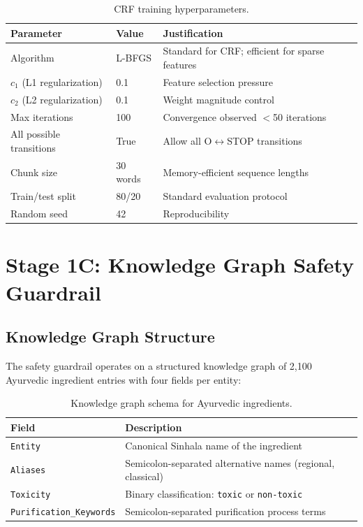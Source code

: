 \documentclass[12pt, a4paper, twoside]{report}
\begin{document}
\begin{table}[htbp]
\centering
\caption{CRF training hyperparameters.}
\label{tab:crf-params}
\begin{tabular}{lll}
\toprule
\textbf{Parameter} & \textbf{Value} & \textbf{Justification} \\
\midrule
Algorithm & L-BFGS & Standard for CRF; efficient for sparse features \\
$c_1$ (L1 regularization) & 0.1 & Feature selection pressure \\
$c_2$ (L2 regularization) & 0.1 & Weight magnitude control \\
Max iterations & 100 & Convergence observed $<$50 iterations \\
All possible transitions & True & Allow all O$\leftrightarrow$STOP transitions \\
Chunk size & 30 words & Memory-efficient sequence lengths \\
Train/test split & 80/20 & Standard evaluation protocol \\
Random seed & 42 & Reproducibility \\
\bottomrule
\end{tabular}
\end{table}

\section{Stage 1C: Knowledge Graph Safety Guardrail}
\label{sec:kg-method}

\subsection{Knowledge Graph Structure}

The safety guardrail operates on a structured knowledge graph of 2,100 Ayurvedic ingredient entries with four fields per entity:

\begin{table}[htbp]
\centering
\caption{Knowledge graph schema for Ayurvedic ingredients.}
\label{tab:kg-schema}
\begin{tabular}{lp{8cm}}
\toprule
\textbf{Field} & \textbf{Description} \\
\midrule
\texttt{Entity} & Canonical Sinhala name of the ingredient \\
\texttt{Aliases} & Semicolon-separated alternative names (regional, classical) \\
\texttt{Toxicity} & Binary classification: \texttt{toxic} or \texttt{non-toxic} \\
\texttt{Purification\_Keywords} & Semicolon-separated purification process terms \\
\bottomrule
\end{tabular}
\end{table}
\end{document}
